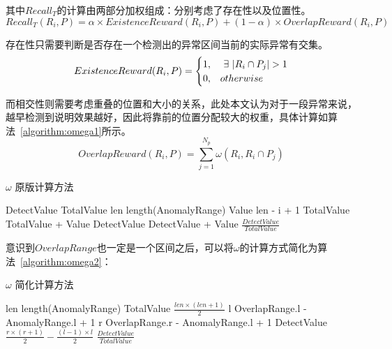 其中$Recall_T$的计算由两部分加权组成：分别考虑了存在性以及位置性。
\begin{equation*}
  Recall_T(R_i,P) = \alpha \times ExistenceReward(R_i,P) + (1-\alpha) \times OverlapReward (R_i,P)
\end{equation*}

存在性只需要判断是否存在一个检测出的异常区间当前的实际异常有交集。
\begin{equation*}
ExistenceReward(R_i,P) = \begin{cases} 1, & \ \exists \  | R_i \cap P_j|>1 \cr 0, & otherwise \end{cases}
\end{equation*}

而相交性则需要考虑重叠的位置和大小的关系，此处本文认为对于一段异常来说，越早检测到说明效果越好，因此将靠前的位置分配较大的权重，具体计算如算法~\ref{algorithm:omega1}所示。
\begin{equation*}
  OverlapReward(R_i,P) = \sum_{j=1}^{N_p}\omega(R_i,R_i\cap P_j)
\end{equation*}
\begin{algorithm}
  \caption{$\omega$ 原版计算方法\cite{tatbul2018precision}}
  \begin{algorithmic}[1]
      \State DetectValue 
      \State TotalValue 
      \State len \gets length(AnomalyRange)
          \State Value \gets len - i + 1
          \State TotalValue \gets TotalValue + Value
              \State DetectValue \gets DetectValue + Value
          \EndIf
      \EndFor
      \State \Return $\frac{DetectValue}{TotalValue}$
      \EndFunction
  \end{algorithmic}
  \label{algorithm:omega1}
\end{algorithm}

意识到$OverlapRange$也一定是一个区间之后，可以将$\omega$的计算方式简化为算法~\ref{algorithm:omega2}：
  \begin{algorithm}
    \caption{$\omega$ 简化计算方法}
    \begin{algorithmic}[1]
        \State len \gets length(AnomalyRange)
        \State TotalValue \gets $\frac{len \times (len + 1)}{2}$
        \State l \gets OverlapRange.l - AnomalyRange.l + 1
        \State r \gets OverlapRange.r - AnomalyRange.l + 1
        \State DetectValue \gets $\frac{r \times (r+1)}{2} - \frac{(l-1) \times l}{2}$
        \State \Return $\frac{DetectValue}{TotalValue}$
        \EndFunction
    \end{algorithmic}
    \label{algorithm:omega2}
  \end{algorithm}

